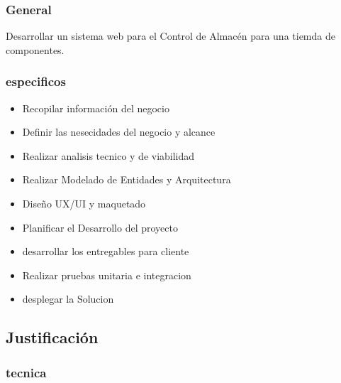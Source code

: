 \documentclass[12pt]{article} %
\begin{document}
\subsubsection*{General}

Desarrollar un sistema web para el Control de Almacén para una tiemda de componentes.

\subsubsection*{especificos}  

\begin{itemize}
  \item Recopilar información del negocio
  \item Definir las nesecidades del negocio y alcance
  \item Realizar analisis tecnico y de viabilidad
  \item Realizar Modelado de Entidades y Arquitectura
  \item Diseño UX/UI y maquetado
  \item Planificar el Desarrollo del proyecto
  \item desarrollar los entregables para cliente
  \item Realizar pruebas unitaria e integracion
  \item desplegar la Solucion
\end{itemize}

\subsection*{Justificación}

\subsubsection*{tecnica}
\end{document}
